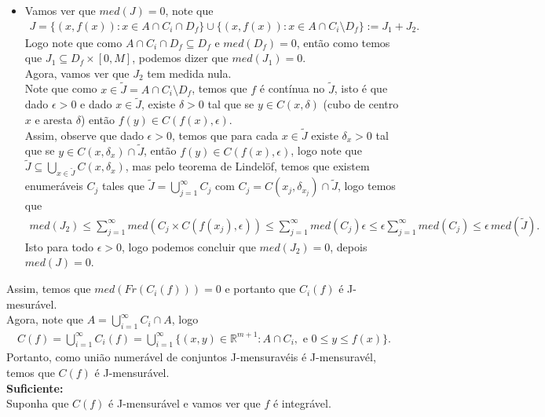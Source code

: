 \begin{homeworkProblem}[Seção 3-5]
\begin{solution}
\begin{itemize}
      \item Vamos ver que $med(J)=0$, note que
        \begin{align*}
          J=\{(x,f(x)):x\in A\cap C_i\cap D_f\}\cup\{(x,f(x)):x\in A\cap C_i\setminus D_f\}:=J_1+J_2.
        \end{align*}
        Logo note que como $A\cap C_i\cap D_f\subseteq D_f$ e $med(D_f)=0$, então como temos que $J_1\subseteq D_f\times [0,M]$, podemos dizer que $med(J_1)=0$.\\
        Agora, vamos ver que $J_2$ tem medida nula.\\
        Note que como $x\in \tilde{J}=A\cap C_i\setminus D_f$, temos que $f$ é contínua no $\tilde{J}$, isto é que dado $\epsilon>0$ e dado $x\in \tilde{J}$, existe $\delta>0$ tal que se $y\in C(x,\delta)$ (cubo de centro $x$ e aresta $\delta$) então $f(y)\in C(f(x),\epsilon)$.\\
        Assim, observe que dado $\epsilon>0$, temos que para cada $x\in \tilde{J}$ existe $\delta_x>0$ tal que se $y\in C(x,\delta_x)\cap \tilde{J}$, então $f(y)\in C(f(x),\epsilon)$, logo note que $\tilde{J}\subseteq \bigcup_{x\in \tilde{J}}C(x,\delta_x)$, mas pelo teorema de Lindelöf, temos que existem enumeráveis $C_j$ tales que $\tilde{J}= \bigcup_{j=1}^{\infty}C_j$ com $C_j=C(x_j,\delta_{x_j})\cap \tilde{J}$, logo temos que
        \begin{align*}
          med(J_2)\leq \sum_{j=1}^{\infty}med(C_{j}\times C(f(x_j),\epsilon))
          \leq \sum_{j=1}^{\infty}med(C_j)\epsilon
          \leq \epsilon \sum_{j=1}^{\infty}med(C_j)
          \leq \epsilon\, med(\tilde{J}).
        \end{align*}
        Isto para todo $\epsilon>0$, logo podemos concluir que $med(J_2)=0$, depois $med(J)=0$. 
    \end{itemize}
    Assim, temos que $med(Fr(C_i(f)))=0$ e portanto que $C_i(f)$ é J-mesurável.\\
    Agora, note que $A=\bigcup_{i=1}^{\infty}C_i\cap A$, logo
    \begin{align*}
      C(f)=\bigcup_{i=1}^{\infty}C_i(f)=\bigcup_{i=1}^{\infty}\{(x,y)\in\mathbb{R}^{m+1}:A\cap C_i,\text{ e }0\leq y\leq f(x)\}.
    \end{align*}
    Portanto, como união numerável de conjuntos J-mensuravéis é J-mensuravél, temos que $C(f)$ é J-mensurável.\\
  \textbf{Suficiente:}\\
    Suponha que $C(f)$ é J-mensurável e vamos ver que $f$ é integrável.\\

\end{solution}
\end{homeworkProblem}
